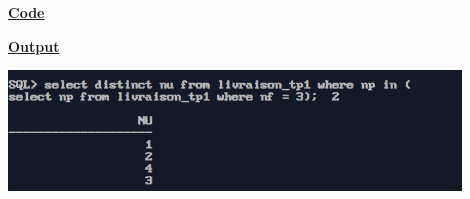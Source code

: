 \newpage
{}

\textbf{\underline{Code}}


\vspace{1cm}
\textbf{\underline{Output}}
\vspace{1cm}
\begin{center}
    \includegraphics[width=0.9\textwidth]{Questions/q22/q22.png}
\end{center}


